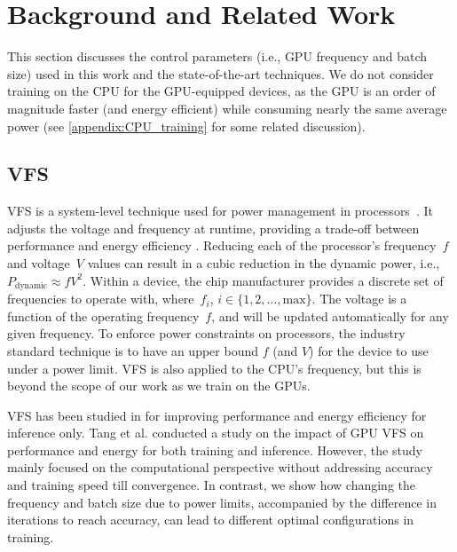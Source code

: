 \section{Background and Related Work}
\label{sec:background}
This section discusses the control parameters (i.e., GPU frequency and batch size)  used in this work and the state-of-the-art techniques.
We do not consider training on the CPU for the GPU-equipped devices, as the GPU is an order of magnitude faster (and energy efficient) while consuming nearly the same average power (see \cref{appendix:CPU_training} for some related discussion).

\subsection{\ac{VFS}} 
\label{sec:vfs}
\ac{VFS} is a system-level technique used for power management in processors~\cite{dvfs_thread_powercap, power_constrainted_gpus}. 
It adjusts the voltage and frequency at runtime, providing a trade-off between performance and energy efficiency \cite{dvfs_energy, dvfs_gpu_energy}. Reducing each of the processor's frequency~$f$ and voltage~$V$ values can result in a cubic reduction in the dynamic power, i.e., 
$
    P_{\text{dynamic}} \approx fV^{2}.
$
Within a device, the chip manufacturer provides a discrete set of frequencies to operate with, where~$f_{i}$,  $i \in \{1, 2, \ldots , \text{max}\}$. 
The voltage is a function of the operating frequency~$f$, and will be updated automatically for any given frequency. 
To enforce power constraints on processors, the industry standard technique is to have an upper bound $f$ (and $V$) for the device to use under a power limit. \ac{VFS} is also applied to the CPU's frequency, but this is beyond the scope of our work as we train on the GPUs.


\ac{VFS} has been studied in \cite{dvfs_precision_control_nn, dvfs_energy_efficiency_hw_nn} for improving performance and energy efficiency for inference only. Tang et al. \cite{gpu_dvfs_impact_study} conducted a study on the impact of GPU \ac{VFS} on performance and energy for both training and inference. However, the study mainly focused on the computational perspective without addressing accuracy and training speed till convergence. In contrast, we show how changing the frequency and batch size due to power limits, accompanied by the difference in iterations to reach accuracy, can lead to different optimal configurations in training. 





